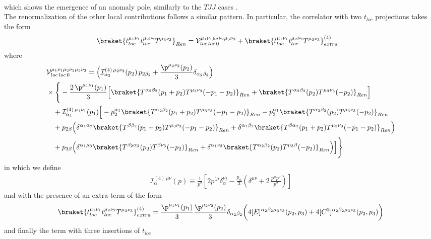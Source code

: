 \documentclass[a4paper,11pt,openright,twoside]{book}
\let\a=\alpha   \let\b=\beta   \let\g=\gamma   \let\d=\delta
\numberwithin{equation}{section}
\begin{document}
{{\begin{align}
\end{align}
which shows the emergence of an anomaly pole, similarly to the $TJJ$ cases  \cite{Giannotti:2008cv,Armillis:2009pq,Coriano:2018zdo}. \\
The renormalization of the other local contributions follows a similar pattern. In particular, the correlator with two $t_{loc}$ projections takes the form
\begin{align}
	&\braket{t_{loc}^{\mu_1\nu_1}t_{loc}^{\mu_2\nu_2}T^{\mu_3\nu_3}}_{Ren}= \mathcal{V}^{\mu_1\nu_1\mu_2\nu_2\mu_3\nu_3}_{loc\, loc \, 0} +\braket{t_{loc}^{\mu_1\nu_1}t_{loc}^{\mu_2\nu_2}T^{\mu_3\nu_3}}^{(4)}_{extra}
\end{align}
where
\begin{align}
	&\mathcal{V}^{\mu_1\nu_1\mu_2\nu_2\mu_3\nu_3}_{loc\, loc \, 0}=\Big(\mathcal{I}^{(4)\,\mu_2\nu_2}_{\a_2}(p_2)\,p_{2\b_2}+\frac{\p^{\mu_2\nu_2}(p_2)}{3}\d_{\a_2\b_2}\Big)\notag\\
	&\times\Bigg\{-\frac{2\,\p^{\mu_1\nu_1}(p_1)}{3}\Big[\braket{T^{\a_2\b_2}(p_1+p_2)T^{\mu_3\nu_3}(-p_1-p_2)}_{Ren}+\braket{T^{\a_2\b_2}(p_2)T^{\mu_3\nu_3}(-p_2)}_{Ren}\Big]
	\notag\\
	&\quad+\mathcal{I}^{(4)\,\mu_1\nu_1}_{\a_1}(p_1)\Big[-p_2^{\a_1}\braket{T^{\a_2\b_2}(p_1+p_2)T^{\mu_3\nu_3}(-p_1-p_2)}_{Ren}-p_3^{\a_1}\braket{T^{\a_2\b_2}(p_2)T^{\mu_3\nu_3}(-p_2)}_{Ren}\notag\\
	&\quad+p_{2\b}\Big(\d^{\a_1\a_2}\braket{T^{\b\b_2}(p_1+p_2)T^{\mu_3\nu_3}(-p_1-p_2)}_{Ren}+\d^{\a_1\b_2}\braket{T^{\b\a_2}(p_1+p_2)T^{\mu_3\nu_3}(-p_1-p_2)}_{Ren}\Big)\notag\\
	&\quad+p_{3\b}\Big(\d^{\a_1\mu_3}\braket{T^{\b_2\a_2}(p_2)T^{\b\nu_3}(-p_2)}_{Ren}+\d^{\a_1\nu_3}\braket{T^{\a_2\b_2}(p_2)T^{\mu_3\b}(-p_2)}_{Ren}\Big)\Big]\Bigg\}
\end{align}
in which we define 
\begin{align}
	\mathcal{I}^{(4)\,\mu\nu}_{\a}(p)\equiv \frac{1}{p^2}\left[2 p^{(\mu}\delta^{\nu)}_\alpha - 
	\frac{p_\alpha}{3}\left(\delta^{\mu\nu} +2\,\frac{p^\mu p^\nu}{p^2}\right)\right]
\end{align}
and with the presence of an extra term of the form
\begin{align}
	\braket{t_{loc}^{\mu_1\nu_1}t_{loc}^{\mu_2\nu_2}T^{\mu_3\nu_3}}^{(4)}_{extra}=\frac{\p^{\mu_1\nu_1}(p_1)}{3}\frac{\p^{\mu_2\nu_2}(p_2)}{3}\d_{\a_2\b_2}\bigg(4[E]^{\a_2\b_2\mu_3\nu_3}(p_2,p_3)+4[C^2]^{\a_2\b_2\mu_3\nu_3}(p_2,p_3)\bigg)
\end{align}
and finally the term with three insertions of $t_{loc}$
}}
\end{document}
